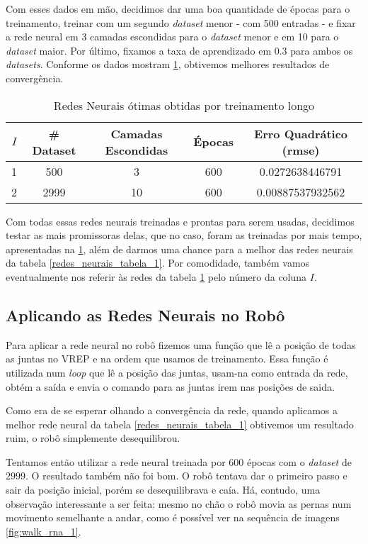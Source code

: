 \documentclass[twoside,conference,a4paper]{IEEEtran}
\begin{document}
Com esses dados em mão, decidimos dar uma boa quantidade de épocas para o treinamento, treinar com um segundo \textsl{dataset} menor - com 500 entradas - e fixar a rede neural em 3  camadas escondidas para o \textsl{dataset} menor e em 10 para o \textsl{dataset} maior. Por último, fixamos a taxa de aprendizado em $0.3$ para ambos os \textsl{datasets}. Conforme os dados mostram \ref{redes_neurais_tabela_3}, obtivemos melhores resultados de convergência.

 \begin{table}[h]
\caption{Redes Neurais ótimas obtidas por treinamento longo}
 \label{redes_neurais_tabela_3}
 \begin{center}
 \begin{tabular}{|c|c|c|c|c|}
 \hline
 $I$ & \# Dataset & Camadas Escondidas & Épocas & Erro Quadrático (rmse) \\
 \hline
 1 & 500  & 3 & 600 & 0.0272638446791 \\
 2 & 2999 & 10 & 600 & 0.00887537932562 \\
 \hline
 \end{tabular}
 \end{center}
 \end{table}

Com todas essas redes neurais treinadas e prontas para serem usadas, decidimos testar as mais promissoras delas, que no caso, foram as treinadas por mais tempo, apresentadas na \ref{redes_neurais_tabela_3}, além de darmos uma chance para a melhor das redes neurais da tabela \ref{redes_neurais_tabela_1}. Por comodidade, também vamos eventualmente nos referir às redes da tabela \ref{redes_neurais_tabela_3} pelo número da coluna $I$.

\subsection{Aplicando as Redes Neurais no Robô}

Para aplicar a rede neural no robô fizemos uma função que lê a posição de todas as juntas no VREP e na ordem que usamos de treinamento. Essa função é utilizada num \textsl{loop} que lê a posição das juntas, usam-na como entrada da rede, obtém a saída e envia o comando para as juntas irem nas posições de saida.

Como era de se esperar olhando a convergência da rede, quando aplicamos a melhor rede neural da tabela \ref{redes_neurais_tabela_1} obtivemos um resultado ruim, o robô simplemente desequilibrou.

Tentamos então utilizar a rede neural treinada por 600 épocas com o \textsl{dataset} de $2999$. O resultado também não foi bom. O robô tentava dar o primeiro passo e sair da posição inicial, porém se desequilibrava e caía. Há, contudo, uma observação interessante a ser feita: mesmo no chão o robô movia as pernas num movimento semelhante a andar, como é possível ver na sequência de imagens \ref{fig:walk_rna_1}.
\end{document}
